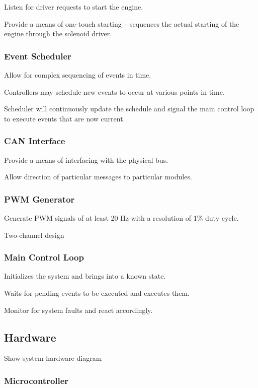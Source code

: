 Listen for driver requests to start the engine.

Provide a means of one-touch starting -- sequences the actual starting
of the engine through the solenoid driver. 


\subsubsection{Event Scheduler}

Allow for complex sequencing of events in time.

Controllers may schedule new events to occur at various points in
time.

Scheduler will continuously update the schedule and signal the main
control loop to execute events that are now current.


\subsubsection{CAN Interface}

Provide a means of interfacing with the physical bus. 

Allow direction of particular messages to particular modules.


\subsubsection{PWM Generator}

Generate PWM signals of at least 20 Hz with a resolution of 1\% duty
cycle.

Two-channel design


\subsubsection{Main Control Loop}

Initializes the system and brings into a known state.

Waits for pending events to be executed and executes them.

Monitor for system faults and react accordingly.


\subsection{Hardware}

Show system hardware diagram


\subsubsection{Microcontroller}


